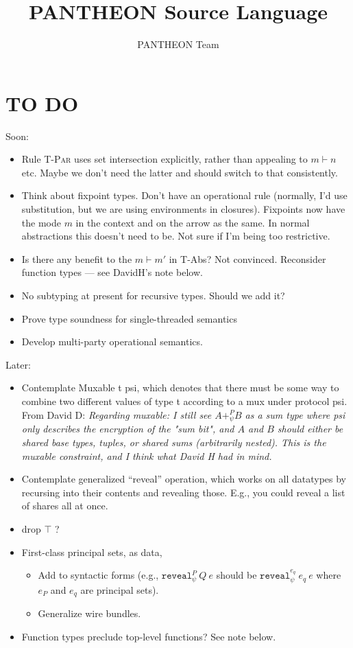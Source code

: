 \documentclass[10pt]{article}
\title{PANTHEON Source Language}
\author{PANTHEON Team}
\newcommand{\rulelab}[1]{{\small \textsc{#1}}}
\newcommand{\kw}[1]{\ensuremath{\mathtt{#1}}}
\newcommand{\ereveal}[4]{\ensuremath{\kw{reveal}^{#1}_{#4}~{#2}~{#3}}}
\begin{document}
\maketitle

\section{TO DO}

Soon:
\begin{itemize}
\item Rule \rulelab{T-Par} uses set intersection explicitly, rather
  than appealing to $m \vdash n$ etc. Maybe we don't need the latter
  and should switch to that consistently.
\item Think about fixpoint types. Don't have an operational rule
  (normally, I'd use substitution, but we are using environments in
  closures). Fixpoints now have the mode $m$ in the context and on the
  arrow as the same. In normal abstractions this doesn't need to
  be. Not sure if I'm being too restrictive.
\item Is there any benefit to the $m \vdash m'$ in T-Abs? Not
  convinced. Reconsider function types --- see DavidH's note below.
\item No subtyping at present for recursive types. Should we add
  it?
\item Prove type soundness for single-threaded semantics
\item Develop multi-party operational semantics.
\end{itemize}


Later:
\begin{itemize}
\item Contemplate Muxable t psi, which denotes that there must be some
  way to combine two different values of type t according to a mux
  under protocol psi. From David D: \emph{Regarding muxable: I still see $A +^P_{\psi} B$ as a sum type where psi only describes the encryption of the "sum bit", and $A$ and $B$ should either be shared base types, tuples, or shared sums (arbitrarily nested). This is the muxable constraint, and I think what David H had in mind.}
\item Contemplate generalized ``reveal'' operation, which works on all
  datatypes by recursing into their contents and revealing
  those. E.g., you could reveal a list of shares all at once.
\item drop $\top$ ?
\item First-class principal sets, as data,
  \begin{itemize}
    \item Add to syntactic forms (e.g., $\ereveal{P}{Q}{e}{\psi}$ should be
    $\ereveal{e_q}{e_q}{e}{\psi}$ where $e_P$ and $e_q$ are principal
    sets).
  \item Generalize wire bundles.
  \end{itemize}
\item Function types preclude top-level functions? See note below.
\end{itemize}
\end{document}
